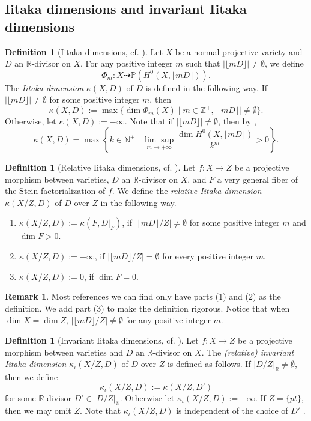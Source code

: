 \documentclass[11pt]{amsart}
\numberwithin{equation}{section}
\newcommand{\Pp}{\mathbb{P}}
\newcommand{\Rr}{\mathbb{R}}
\newcommand{\Zz}{\mathbb{Z}}
\theoremstyle{definition}
\newtheorem{rem}[thm]{Remark}
\theoremstyle{definition}
\newtheorem{defn}[thm]{Definition}
\begin{document}
\subsection{Iitaka dimensions and invariant Iitaka dimensions}
\begin{defn}[Iitaka dimensions, cf. {\cite[II 3.2 Definition]{Nak04}}]\label{defn: Iitaka dimension}
Let $X$ be a normal projective variety and $D$ an $\Rr$-divisor on $X$. For any positive integer $m$ such that $|\lfloor mD\rfloor|\not=\emptyset$, we define $$\Phi_m: X\dashrightarrow\Pp(H^0(X,\lfloor mD\rfloor)).$$
The \emph{Iitaka dimension} $\kappa(X,D)$ of $D$ is defined in the following way. If $|\lfloor mD\rfloor|\not=\emptyset$ for some positive integer $m$, then
$$\kappa(X,D):=\max\{\dim\Phi_m(X)\mid {m\in\Zz^+,|\lfloor mD\rfloor|\not=\emptyset}\}.$$
Otherwise, let $\kappa(X,D):=-\infty$. Note that if $|\lfloor mD\rfloor|\not=\emptyset$, then by \cite[II 3.8 Corollary]{Nak04},
$$\kappa(X,D)=\max\left\{k\in\mathbb N^+\mid \underset{m\rightarrow+\infty}{\lim\sup}\frac{\dim H^0(X,\lfloor mD\rfloor)}{k^m}>0\right\}.$$
\end{defn}

\begin{defn}[Relative Iitaka dimensions, cf. {\cite[Definition 2.1.1]{Cho08}}]
Let $f: X\rightarrow Z$ be a projective morphism between varieties, $D$ an $\Rr$-divisor on $X$, and $F$ a very general fiber of the Stein factorialization of $f$. We define the \emph{relative Iitaka dimension} $\kappa(X/Z,D)$ of $D$ over $Z$ in the following way.
\begin{enumerate}
    \item $\kappa(X/Z,D):=\kappa(F,D|_F)$, if $|\lfloor mD\rfloor/Z|\not=\emptyset$ for some positive integer $m$ and $\dim F>0$.
    \item $\kappa(X/Z,D):=-\infty$, if $|\lfloor mD\rfloor/Z|=\emptyset$ for every positive integer $m$.
    \item $\kappa(X/Z,D):=0$, if $\dim F=0$.
\end{enumerate}
\end{defn}
\begin{rem}
Most references we can find only have parts (1) and (2) as the definition. We add part (3) to make the definition rigorous. Notice that when $\dim X=\dim Z$, $|\lfloor mD\rfloor/Z|\not=\emptyset$ for any positive integer $m$.
\end{rem}


\begin{defn}[Invariant Iitaka dimensions, cf. {\cite[Definition 2.2.1]{Cho08}}]
Let $f: X\rightarrow Z$ be a projective morphism between varieties and $D$ an $\Rr$-divisor on $X$. The \emph{(relative) invariant Iitaka dimension} $\kappa_{\iota}(X/Z,D)$ of $D$ over $Z$ is defined as follows. If $|D/Z|_{\Rr}\not=\emptyset$, then we define
$$\kappa_{\iota}(X/Z,D):=\kappa(X/Z,D')$$
for some $\Rr$-divisor $D'\in|D/Z|_\Rr$. Otherwise let $\kappa_{\iota}(X/Z,D):=-\infty$. If $Z=\{pt\}$, then we may omit $Z$. Note that $\kappa_{\iota}(X/Z,D)$ is independent of the choice of $D'$ \cite[Corollary 2.1.4]{Cho08}.
\end{defn}
\end{document}
